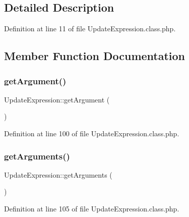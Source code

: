 \subsection{Detailed Description}


Definition at line 11 of file Update\+Expression.\+class.\+php.



\subsection{Member Function Documentation}
\mbox{\label{classUpdateExpression_a86d860d80b3053bd4bcff511160aca3b}} 
\subsubsection{\texorpdfstring{get\+Argument()}{getArgument()}}
{\footnotesize\ttfamily Update\+Expression\+::get\+Argument (\begin{DoxyParamCaption}{ }\end{DoxyParamCaption})}



Definition at line 100 of file Update\+Expression.\+class.\+php.

\mbox{\label{classUpdateExpression_a898b47f8e6a8191fd75143d402884b02}} 
\subsubsection{\texorpdfstring{get\+Arguments()}{getArguments()}}
{\footnotesize\ttfamily Update\+Expression\+::get\+Arguments (\begin{DoxyParamCaption}{ }\end{DoxyParamCaption})}



Definition at line 105 of file Update\+Expression.\+class.\+php.

\mbox{\label{classUpdateExpression_a1824b01ff4d35cec7d284fcd192d1c58}} 
